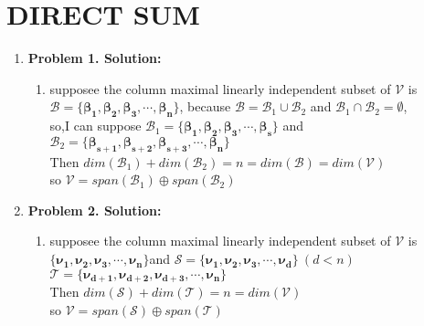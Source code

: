 \documentclass[english,onecolumn,UTF8]{IEEEtran}
\begin{document}
\section{DIRECT SUM}

\begin{enumerate}
	
	\item \textbf{Problem 1. Solution:}
	\begin{enumerate}
	\item supposee the column maximal linearly independent subset of $\mathcal V$ is $\mathcal B = \{\boldsymbol{\beta_1},\boldsymbol{\beta_2},\boldsymbol{\beta_3},\cdots,\boldsymbol{\beta_n}\}$, because $\mathcal B = \mathcal B_1 \cup \mathcal B_2$ and $\mathcal B_1 \cap \mathcal B_2 = \emptyset $,
\\so,I can suppose $\mathcal B_1 = \{\boldsymbol{\beta_1},\boldsymbol{\beta_2},\boldsymbol{\beta_3},\cdots,\boldsymbol{\beta_s}\}$ and $\mathcal B_2 = \{\boldsymbol{\beta_{s+1}},\boldsymbol{\beta_{s+2}},\boldsymbol{\beta_{s+3}},\cdots,\boldsymbol{\beta_n}\}$
\\Then $dim(\mathcal B_1)+dim(\mathcal B_2)=n=dim(\mathcal B)=dim(\mathcal V)$
\\so $\mathcal V = span(\mathcal B_1)\oplus span(\mathcal B_2)$
	\end{enumerate}	


	\item \textbf{Problem 2. Solution:}
	\begin{enumerate}
	\item supposee the column maximal linearly independent subset of $\mathcal V$ is $\{\boldsymbol{\nu_1},\boldsymbol{\nu_2},\boldsymbol{\nu_3},\cdots,\boldsymbol{\nu_n}\}$and $\mathcal S = \{\boldsymbol{\nu_1},\boldsymbol{\nu_2},\boldsymbol{\nu_3},\cdots,\boldsymbol{\nu_d}\} \ (d<n)$
\\$\mathcal T = \{\boldsymbol{\nu_{d+1}},\boldsymbol{\nu_{d+2}},\boldsymbol{\nu_{d+3}},\cdots,\boldsymbol{\nu_n}\}$
\\Then $dim(\mathcal S)+dim(\mathcal T)=n=dim(\mathcal V)$
\\so $\mathcal V = span(\mathcal S)\oplus span(\mathcal T)$

	\end{enumerate}


\end{enumerate}
\end{document}
